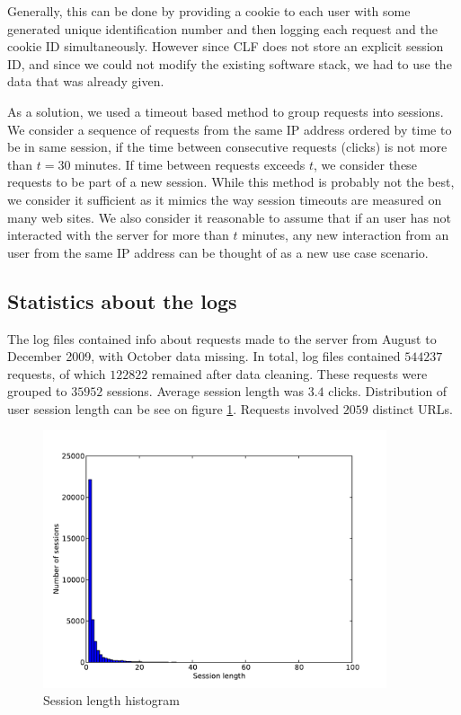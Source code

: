 \documentclass[english,a4paper]{article}
\begin{document}
Generally, this can be done by providing a cookie to each user with some generated unique identification number and then logging each request and the cookie ID simultaneously. However since CLF does not store an explicit session ID, and since we could not modify the existing software stack, we had to use the data that was already given.  

As a solution, we used a timeout based method to group requests into sessions. We consider a sequence of requests from the same IP address ordered by time to be in same session, if the time between consecutive requests (clicks) is not more
than $t = 30$ minutes. If time between requests exceeds $t$, we consider these requests to be part of a new session. While this method is probably not the best, we consider it sufficient as it mimics the way session timeouts are measured on many web sites. We also consider it reasonable to assume that if an user has not interacted with the server for more than $t$
minutes, any new interaction from an user from the same IP address can be thought of as a new use case scenario.







\subsection{Statistics about the logs} 
The log files contained info about requests made to the server from August to December 2009, with October data missing. In total, log files contained 
$544237$ requests, of which $122822$ remained after data cleaning. These requests were grouped to $35952$ sessions. Average session length was $3.4$ clicks. Distribution of user session length can be see on figure \ref{session_len}. Requests involved $2059$ distinct URLs. 

\begin{figure}[H]
  \centering
      \includegraphics[width=0.9\textwidth]{session_len}
  \caption{Session length histogram}
  \label{session_len}
\end{figure}
\end{document}
